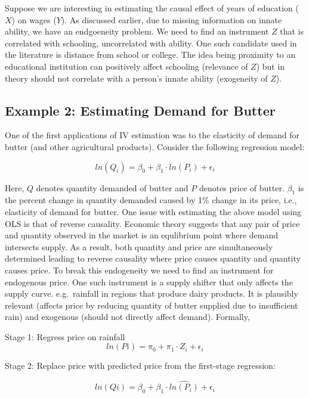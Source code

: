 \documentclass[
]{book}
\theoremstyle{definition}
\theoremstyle{definition}
\theoremstyle{definition}
\theoremstyle{definition}
\theoremstyle{remark}
\begin{document}
Suppose we are interesting in estimating the causal effect of years of education (\(X\)) on wages (\(Y\)). As discussed earlier, due to missing information on innate ability, we have an endgoeneity problem. We need to find an instrument \(Z\) that is correlated with schooling, uncorrelated with ability. One such candidate used in the literature is distance from school or college. The idea being proximity to an educational institution can positively affect schooling (relevance of \(Z\)) but in theory should not correlate with a person's innate ability (exogeneity of \(Z\)).

\hypertarget{example-2-estimating-demand-for-butter}{%
\subsection{Example 2: Estimating Demand for Butter}\label{example-2-estimating-demand-for-butter}}

One of the first applications of IV estimation was to the elasticity of demand for butter (and other agricultural products). Consider the following regression model:

\[ln(Q_i)=\beta_0+\beta_1 \cdot ln(P_i)+\epsilon_i\]

Here, \(Q\) denotes quantity demanded of butter and \(P\) denotes price of butter. \(\beta_1\) is the percent change in quantity demanded caused by 1\% change in its price, i.e., elasticity of demand for butter. One issue with estimating the above model using OLS is that of reverse causality. Economic theory suggests that any pair of price and quantity observed in the market is an equlibrium point where demand intersects supply. As a result, both quantity and price are simultaneously determined leading to reverse causality where price causes quantity and quantity causes price. To break this endogeneity we need to find an instrument for endogenous price. One such instrument is a supply shifter that only affects the supply curve. e.g.~rainfall in regions that produce dairy products. It is plausibly relevant (affects price by reducing quantity of butter supplied due to insufficient rain) and exogenous (should not directly affect demand). Formally,

Stage 1: Regress price on rainfall
\[ln(Pi)=\pi_0+\pi_1\cdot Z_i+\epsilon_i\]

Stage 2: Replace price with predicted price from the first-stage regression:

\[ln(Qi)=\beta_0+\beta_1\cdot \widehat{ln(P_i)}+\epsilon_i\]
\end{document}
